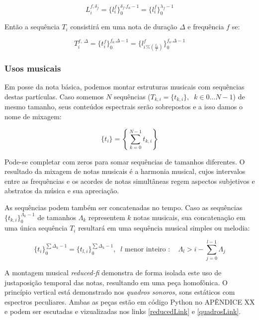 \begin{equation}\label{periodoUnico}
L_i^{f , \delta_f } = \{ l_i^f \}_0^{\delta_f . f_a -1}=\{ l_i^f \}_0^{\lambda_f-1}
\end{equation}

Então a sequência $T_i$ consistirá em uma nota de duração $\Delta$ e frequência $f$ se:

\begin{equation}
T_i^{f,\; \Delta}=\{t_i^f\}_0^{f_a . \Delta-1}=\{l^f_{i\,\%\left(\frac{f_a}{f}\right)}\}_0^{f_a . \Delta-1}
\end{equation}


\subsubsection{Usos musicais}

Em posse da nota básica, podemos montar estruturas musicais com
sequências destas partículas. Caso somemos $N$ sequências ($T_{k,i}=\{t_{k,i}\}, \;\; k \in 0...N-1$) de mesmo tamanho, seus conteúdos espectrais serão sobrepostos e a isso damos o nome de mixagem:

\begin{equation}
\{t_i\}=\left \{ \sum_{k=0}^{N-1}t_{k,i} \right \}
\end{equation}

Pode-se completar com zeros para somar sequências de tamanhos diferentes. O resultado da mixagem de notas musicais é a harmonia musical, cujos intervalos entre as frequências e os acordes de notas simultâneas regem aspectos subjetivos e abstratos da música e sua apreciação.

As sequências podem também ser concatenadas no tempo. Caso as sequências $\{t_{k,i}\}_0^{\Lambda_k-1}$ de tamanhos $\Lambda_k$  representem $k$ notas musicais, sua concatenação em uma única sequência $T_i$ resultará em uma sequência musical simples ou melodia:

\begin{equation}
\{t_i\}_0^{\sum\Delta_k-1}=\{t_{l,i}\}_0^{\sum\Delta_k-1}, \;\; l\text{ menor inteiro } : \quad \Lambda_l > i -\sum_{j=0}^{l-1}\Lambda_j
\end{equation}

A montagem musical \emph{reduced-fi} demonstra de forma isolada este uso de justaposição temporal das notas, resultando em uma peça homofônica. O princípio vertical está demonstrado nos \emph{quadros sonoros}, sons estáticos com espectros peculiares. Ambas as peças estão em código Python no APÊNDICE XX e podem ser escutadas e vizualizadas nos links \ref{reducedLink} e \ref{quadrosLink}.

